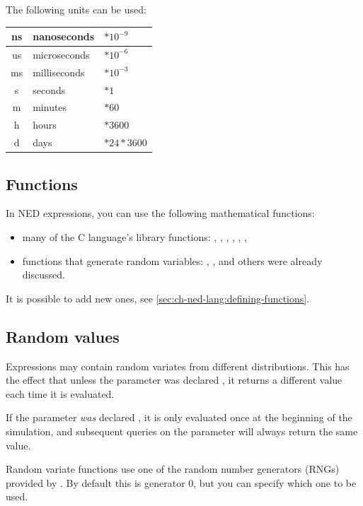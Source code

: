 The following units can be used:

\begin{longtable}{|c|l|l|}
\hline
ns & nanoseconds & $*10^{-9}$ \\\hline
us & microseconds & $*10^{-6}$ \\\hline
ms & milliseconds & $*10^{-3}$ \\\hline
s  & seconds & $*1$ \\\hline
m  & minutes & $*60$ \\\hline
h  & hours & $*3600$ \\\hline
d  & days & $*24*3600$ \\\hline
\end{longtable}




\subsection{Functions}

In NED expressions, you can use the following mathematical functions:
\begin{itemize}
  \item{many of the C language's  library functions:
    , , , , ,
    , }
  \item{functions that generate random variables: ,
    ,  and others were already
    discussed.}
\end{itemize}

It is possible to add new ones, see \ref{sec:ch-ned-lang:defining-functions}.

\subsection{Random values}

Expressions may contain random variates from different distributions.
This has the effect that unless the parameter was declared ,
it returns a different value each time it is evaluated.

If the parameter \textit{was} declared , it is only evaluated
once at the beginning of the simulation, and subsequent queries
on the parameter will always return the same value.

Random variate functions use one of the random number generators (RNGs)
provided by \opp. By default this is generator 0, but you can specify
which one to be used.

